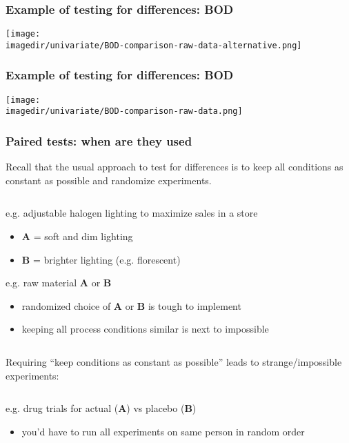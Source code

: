 \begin{frame}\frametitle{Example of testing for differences: BOD}
	\vspace{12pt}

	\hspace{-0.75cm}\texttt{[image: \\imagedir/univariate/BOD-comparison-raw-data-alternative.png]}
\end{frame}

\begin{frame}\frametitle{Example of testing for differences: BOD}
	\begin{center}
		\texttt{[image: \\imagedir/univariate/BOD-comparison-raw-data.png]}
	\end{center}
\end{frame}

\begin{frame}\frametitle{Paired tests: when are they used}

	Recall that the usual approach to test for differences is to keep all conditions as constant as possible and randomize experiments.

	$\quad$

	e.g. adjustable halogen lighting to maximize sales in a store
	\begin{itemize}
		\item	\textbf{A} = soft and dim lighting
		\item	\textbf{B} = brighter lighting (e.g. florescent)
	\end{itemize}

	e.g. raw material \textbf{A} or \textbf{B}
	\begin{itemize}
		\item	randomized choice of \textbf{A} or \textbf{B} is tough to implement
		\item	keeping all process conditions similar is next to impossible
	\end{itemize}

	$\quad$

	Requiring ``keep conditions as constant as possible'' leads to strange/impossible experiments:

	$\quad$

	e.g. drug trials for actual (\textbf{A}) vs placebo (\textbf{B})
	\begin{itemize}
		\item	you'd have to run all experiments on same person in random order
	\end{itemize}
\end{frame}

